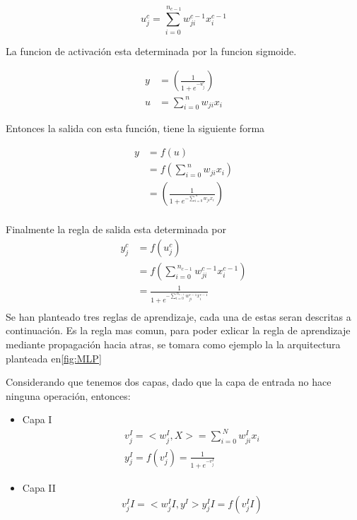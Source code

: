 \documentclass[12pt]{article}
\newcounter{subsubsubsection}[subsubsection]
\newcounter{subsubsubsubsection}[subsubsubsection]
\begin{document}
\begin{equation}
u_j^c = \sum_{i=0}^{\ n_{c-1}} w_{ji}^{c-1}x_i^{c-1}
\end{equation}

La funcion de activación esta determinada por la funcion sigmoide.

\begin{equation} \label{eq3}
\begin{split}
y 	&= ( \frac{1}{1+e^{-u_j^c}}) \\
u	&= \sum_{i=0}^{\ n} w_{ji}x_i
\end{split}
\end{equation}

Entonces la salida con esta función, tiene la siguiente forma

\begin{equation} \label{eq1}
\begin{split}
y 	&= f(u)\\
	&= f(\sum_{i=0}^{\ n} w_{ji}x_i)\\
	&= ( \frac{1}{1+e^{-\sum_{i=0}^{\ n} w_{ji}x_i}}) \\
\end{split}
\end{equation}


Finalmente la regla de salida esta determinada por
\begin{equation} \label{eq1}
\begin{split}
y_j^c 	&= f(u_j^c)\\
		&= f(\sum_{i=0}^{\ n_{c-1}} w_{ji}^{c-1}x_i^{c-1})\\
		&=  \frac{1}{1+e^{-\sum_{i=0}^{\ n_{c-1}} w_{ji}^{c-1}x_i^{c-1}}} \\
\end{split}
\end{equation}
Se han planteado tres reglas de aprendizaje, cada una de estas seran descritas a continuación.
Es la regla mas comun, para poder exlicar la regla de aprendizaje mediante propagación hacia atras, se tomara como ejemplo la la arquitectura planteada en\ref{fig:MLP}

Considerando que tenemos dos capas, dado que la capa de entrada no hace ninguna operación, entonces:

\begin{itemize}
\item Capa I
\begin{equation} \label{eq9}
\begin{split}
v_j^I = <w_j^I, X> = \sum_{i=0}^{\ N} w_{ji}^I x_i \\
y_j^I =  f(v_j^I) = \frac{1}{1 + e^{-v_j^I}}
\end{split}
\end{equation}

\item Capa II
\begin{equation} \label{eq10}
v_j^II = <w_j^II, y^I> 
y_j^II =  f(v_j^II) 
\end{equation}
\end{itemize}
\end{document}
